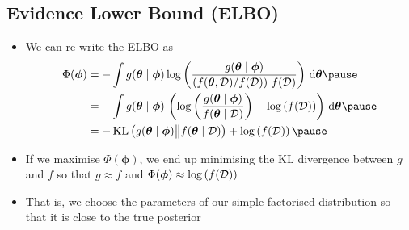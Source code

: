 
\begin{slide}
\section{Evidence Lower Bound (ELBO)}

\begin{PauseHighLight}
  \begin{itemize}
  \item We can re-write the ELBO as
    \begin{align*}
      \Phi(\bm{\phi}) &= -\int g(\bm{\theta}\mid\bm{\phi})
      \logg{\frac{g(\bm{\theta}\mid\bm{\phi})}{\bra{f(\bm{\theta},
                          \data)/f(\data)} \, f(\data)}} \,  \dd \bm{\theta}\pause
      \\
      &=  -\int g(\bm{\theta}\mid\bm{\phi}) \, \bra{
      \logg{\frac{g(\bm{\theta}\mid\bm{\phi})}{f(\bm{\theta}
                          \mid\data)} } - \logg{f(\data)} }\, \dd
        \bm{\theta}\pause
        \\
                        &= -\KL{g(\bm{\theta}\mid\bm{\phi})}{f(\bm{\theta}\mid \data)}
                           + \logg{f(\data)}\pause
    \end{align*}
    \item If we maximise $\Phi(\bm{\phi})$, we end up minimising the KL
      divergence between $g$ and $f$ so that $g\approx f$ and
      $\Phi(\bm{\phi})\approx \log\left( f(\mathcal{D}) \right)$\pause
    \item That is, we choose the parameters of our simple  factorised
      distribution so that it is close to the true posterior\pause
  \end{itemize}
\end{PauseHighLight}

\end{slide}


